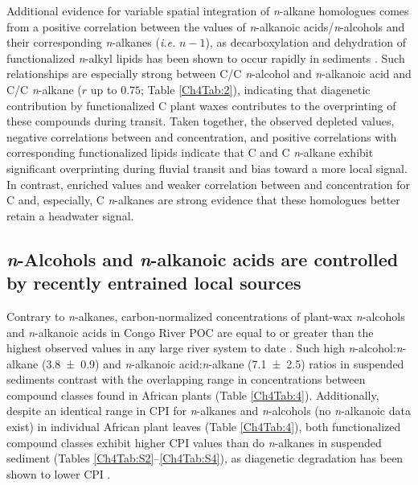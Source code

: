 Additional evidence for variable spatial integration of \textit{n}-alkane homologues comes from a positive correlation between the  values of \textit{n}-alkanoic acids/\textit{n}-alcohols and their corresponding \textit{n}-alkanes (\textit{i.e.} $n - 1$), as decarboxylation and dehydration of functionalized \textit{n}-alkyl lipids has been shown to occur rapidly in sediments \citep{Cranwell:1981vg,Sun:1994wj,Sun:1997wr,Hoefs:2002wu}. Such relationships are especially strong between C/C \textit{n}-alcohol and \textit{n}-alkanoic acid and C/C \textit{n}-alkane ($r$ up to $0.75$; Table \ref{Ch4Tab:2}), indicating that diagenetic contribution by functionalized C plant waxes contributes to the overprinting of these compounds during transit. Taken together, the observed depleted  values, negative correlations between  and concentration, and positive  correlations with corresponding functionalized lipids indicate that C and C \textit{n}-alkane exhibit significant overprinting during fluvial transit and bias toward a more local signal. In contrast, enriched  values and weaker correlation between  and concentration for C and, especially, C \textit{n}-alkanes are strong evidence that these homologues better retain a headwater signal.

\subsection{\textit{n}-Alcohols and \textit{n}-alkanoic acids are controlled by recently entrained local sources}\label{Ch4Sec:52}

Contrary to \textit{n}-alkanes, carbon-normalized concentrations of plant-wax \textit{n}-alcohols and \textit{n}-alkanoic acids in Congo River POC are equal to or greater than the highest observed values in any large river system to date \citep{Saliot:2001un,vanDongen:2008kj,Galy:2011ix,Tao:2015bq}. Such high \textit{n}-alcohol:\textit{n}-alkane (\num{3.8 \pm 0.9}) and \textit{n}-alkanoic acid:\textit{n}-alkane (\num{7.1 \pm 2.5}) ratios in suspended sediments contrast with the overlapping range in concentrations between compound classes found in African plants (Table \ref{Ch4Tab:4}). Additionally, despite an identical range in CPI for \textit{n}-alkanes and \textit{n}-alcohols (no \textit{n}-alkanoic data exist) in individual African plant leaves (Table  \ref{Ch4Tab:4}), both functionalized compound classes exhibit higher CPI values than do \textit{n}-alkanes in suspended sediment (Tables \ref{Ch4Tab:S2}--\ref{Ch4Tab:S4}), as diagenetic degradation has been shown to lower CPI \citep{Meyers:1993vwa}.

